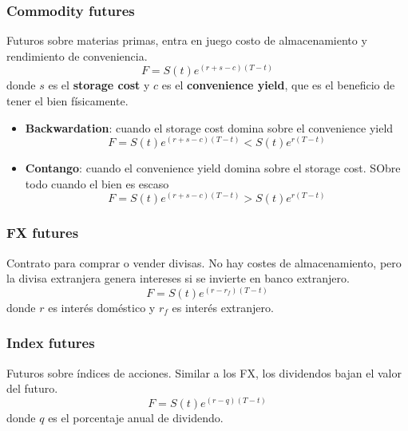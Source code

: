 \subsubsection{Commodity futures}
Futuros sobre materias primas, entra en juego costo de almacenamiento y rendimiento de conveniencia.
\[F=S(t)e^{(r+s-c)(T-t)}\]
donde $s$ es el \textbf{storage cost} y $c$ es el \textbf{convenience yield}, que es el beneficio de tener el bien físicamente.
\begin{itemize}
    \item \textbf{Backwardation}: cuando el storage cost domina sobre el convenience yield
    \[F=S(t)e^{(r+s-c)(T-t)}<S(t)e^{r(T-t)}\]
    \item \textbf{Contango}: cuando el convenience yield domina sobre el storage cost. SObre todo cuando el bien es escaso
    \[F=S(t)e^{(r+s-c)(T-t)}>S(t)e^{r(T-t)}\]
\end{itemize}


\subsubsection{FX futures}
Contrato para comprar o vender divisas. No hay costes de almacenamiento, pero la divisa extranjera genera intereses si se invierte en banco extranjero.
\[F=S(t)e^{(r-r_f)(T-t)}\]
donde $r$ es interés doméstico y $r_f$ es interés extranjero.


\subsubsection{Index futures}
Futuros sobre índices de acciones. Similar a los FX, los dividendos bajan el valor del futuro.
\[F=S(t)e^{(r-q)(T-t)}\]
donde $q$ es el porcentaje anual de dividendo.





